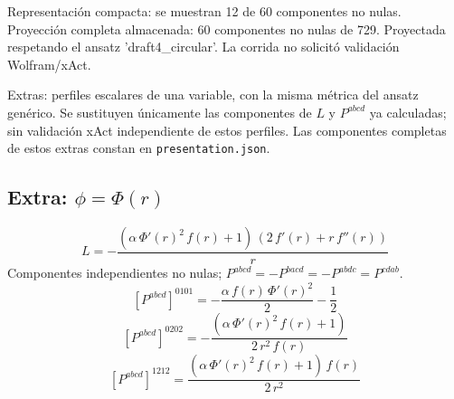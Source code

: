 \documentclass[11pt]{article}
\begin{document}
\par\smallskip
Representación compacta: se muestran 12 de 60 componentes no nulas.
Proyección completa almacenada: 60 componentes no nulas de 729. Proyectada respetando el ansatz 'draft4\_circular'. La corrida no solicitó validación Wolfram/xAct.\par\medskip
\par\medskip Extras: perfiles escalares de una variable, con la misma métrica del ansatz genérico. Se sustituyen únicamente las componentes de $L$ y $P^{abcd}$ ya calculadas; sin validación xAct independiente de estos perfiles. Las componentes completas de estos extras constan en \texttt{presentation.json}.
\subsection*{Extra: $\phi=\Phi\!\left(r\right)$}
\begin{dmath*}[breakdepth={5}]
L=-\frac{\left(\alpha\,{\Phi'\!\left(r\right)}^{2}\,f\!\left(r\right) + 1\right)\,\left(2\,f'\!\left(r\right) + r\,f''\!\left(r\right)\right)}{r}
\end{dmath*}
Componentes independientes no nulas; $P^{abcd}=-P^{bacd}=-P^{abdc}=P^{cdab}$.
\begin{dmath*}[breakdepth={5}]
\left[P^{abcd}\right]^{0101}=-\frac{\alpha\,f\!\left(r\right)\,{\Phi'\!\left(r\right)}^{2}}{2} - \frac{1}{2}
\end{dmath*}
\begin{dmath*}[breakdepth={5}]
\left[P^{abcd}\right]^{0202}=-\frac{\left(\alpha\,{\Phi'\!\left(r\right)}^{2}\,f\!\left(r\right) + 1\right)}{2\,{r}^{2}\,f\!\left(r\right)}
\end{dmath*}
\begin{dmath*}[breakdepth={5}]
\left[P^{abcd}\right]^{1212}=\frac{\left(\alpha\,{\Phi'\!\left(r\right)}^{2}\,f\!\left(r\right) + 1\right)\,f\!\left(r\right)}{2\,{r}^{2}}
\end{dmath*}
\end{document}
